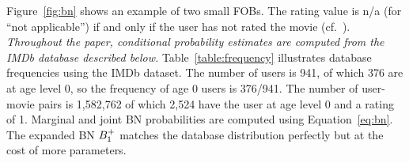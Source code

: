 \documentclass{article}
\begin{document}
Figure~\ref{fig:bn} shows an example of two small FOBs. The rating value is n/a (for ``not applicable'') if and only if the user has not rated the movie (cf.~\cite{Russell2010}). {\em Throughout the paper, conditional probability estimates are computed from the IMDb database described below.} Table~\ref{table:frequency} illustrates database frequencies using the IMDb dataset. 
The number of users is 941, of which 376 are at age level 0, so the frequency of age 0 users is 376/941. The number of user-movie pairs is 1,582,762 of which 2,524 have the user at age level 0 and a  rating of 1. Marginal and joint BN probabilities are computed using Equation~\eqref{eq:bn}. %
The expanded BN $B_{1}^+$ matches the database distribution perfectly but at the cost of more parameters. 






\end{document}
